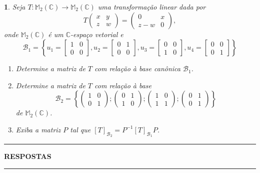 \documentclass[12pt]{exam}
\newtheorem{exercicio}{}
\newcommand{\complex}{\mathbb{C}}
\newcommand{\cp}[1]{\mathbb{#1}}
\begin{document}
\begin{exercicio}
  Seja $T : \cp{M}_2(\complex) \to \cp{M}_2(\complex)$ uma transforma\c{c}\~ao linear dada por
  \[
    T \begin{pmatrix}
      x & y\\
      z & w
    \end{pmatrix} = \begin{pmatrix}
      0 & x\\
      z - w & 0
    \end{pmatrix},
  \]
  onde $\cp{M}_2(\complex)$ é um $\complex$-espa\c{c}o vetorial
  e
  \[
      \mathcal{B}_1 = \left\{u_1 = \begin{bmatrix}
        1 & 0\\0 & 0
      \end{bmatrix}, u_2 = \begin{bmatrix}
        0 & 1\\0 & 0
      \end{bmatrix}, u_3 = \begin{bmatrix}
        0 & 0\\1 & 0
      \end{bmatrix}, u_4 = \begin{bmatrix}
        0 & 0\\0 & 1
      \end{bmatrix}\right\}
  \]
    \begin{enumerate}[label=({\alph*})]
      \item Determine a matriz de $T$ com rela\c{c}\~ao \`a base can\^onica $\mathcal{B}_1$.
      \item Determine a matriz de $T$ com rela\c{c}\~ao \`a base
      \[
        \mathcal{B}_2 = \left\{\begin{pmatrix}
          1 & 0\\
          0 & 1
        \end{pmatrix}; \begin{pmatrix}
          0 & 1\\
          1 & 0
        \end{pmatrix}; \begin{pmatrix}
          1 & 0\\
          1 & 1
        \end{pmatrix}; \begin{pmatrix}
          0 & 1\\
          0 & 1
        \end{pmatrix}\right\}
      \]
      de $\cp{M}_2(\complex)$.
      \item Exiba a matriz $P$ tal que $[T]_{\mathcal{B}_2} = P^{-1}[T]_{\mathcal{B}_1}P$.
    \end{enumerate}
\end{exercicio}

\newpage
{}
\hrule
\begin{center}
{\large\bf RESPOSTAS}
\end{center}
\hrule

\end{document}
